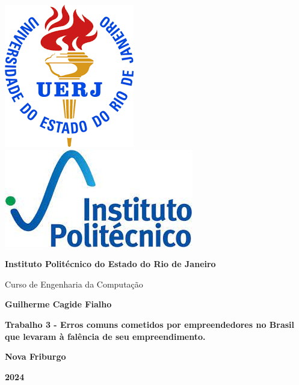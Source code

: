 \begin{titlepage}
    \centering

    \includegraphics[height=0.151\textwidth]{header/contra-capa/assets/uerj.png}\hfill
    \includegraphics[height=0.15\textwidth]{header/contra-capa/assets/iprj.jpeg}\hfill

    \vspace{2cm} %

    {\Large\bfseries Instituto Politécnico do Estado do Rio de Janeiro \par}
    \vspace{0.5cm}
    {\large Curso de Engenharia da Computação \par}

    \vspace{3cm} %

    {\large\bfseries Guilherme Cagide Fialho \par}

    \vspace{3cm}

    {\large\bfseries Trabalho 3 - Erros comuns cometidos por empreendedores no Brasil que levaram à falência de seu empreendimento.\par}

    \vfill %

    {\large\bfseries Nova Friburgo \par}
    \vspace{0.3cm}
    {\large\bfseries 2024 \par}
\end{titlepage}
\newpage %
